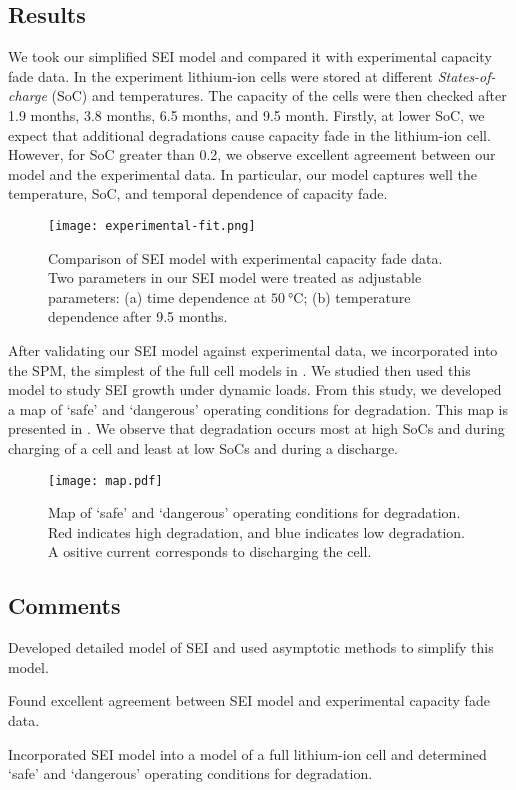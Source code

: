 \documentclass[english,a4paper,oneside,9pt]{extarticle}
\begin{document}
\subsection{Results}
We took our simplified SEI model and compared it with experimental capacity fade data. In the experiment lithium-ion cells were stored at different \emph{States-of-charge} (SoC) and temperatures. The capacity of the cells were then checked after 1.9 months, 3.8 months, 6.5 months, and 9.5 month. Firstly, at lower SoC, we expect that additional degradations cause capacity fade in the lithium-ion cell. However, for SoC greater than 0.2, we observe excellent agreement between our model and the experimental data. In particular, our model captures well the temperature, SoC, and temporal dependence of capacity fade.

\begin{figure}[h]
	\centering
	\texttt{[image: experimental-fit.png]}
	\caption{Comparison of SEI model with experimental capacity fade data. Two parameters in our SEI model were treated as adjustable parameters: (a) time dependence at $\SI{50}{\celsius}$; (b) temperature dependence after 9.5 months.}
	\label{fig:sei}
\end{figure}

After validating our SEI model against experimental data, we incorporated into the SPM, the simplest of the full cell models in . We studied then used this model to study SEI growth under dynamic loads. From this study, we developed a map of `safe' and `dangerous' operating conditions for degradation. This map is presented in . We observe that degradation occurs most at high SoCs and during charging of a cell and least at low SoCs and during a discharge.

\begin{figure}[h]
	\centering
	\texttt{[image: map.pdf]}
	\caption{Map of `safe' and `dangerous' operating conditions for degradation. Red indicates high degradation, and blue indicates low degradation. A ositive current corresponds to discharging the cell.}
	\label{fig:degradation-map}
\end{figure}


\subsection{Comments}
\begin{infommitemize}
	\item Developed detailed model of SEI and used asymptotic methods to simplify this model.
	\item Found excellent agreement between SEI model and experimental capacity fade data.
	\item Incorporated SEI model into a model of a full lithium-ion cell and determined `safe' and `dangerous' operating conditions for degradation.
\end{infommitemize}
\end{document}
